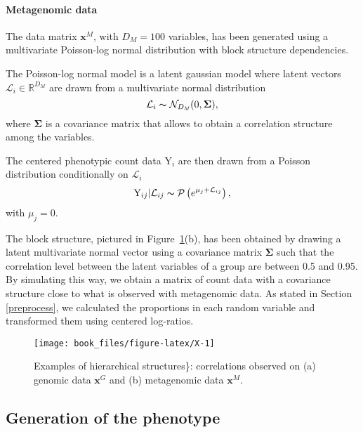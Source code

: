 \documentclass[]{book}
\let\oldparagraph\paragraph
\renewcommand{\paragraph}[1]{\oldparagraph{#1}\mbox{}}
\begin{document}
\hypertarget{metagenomic-data}{%
\paragraph{Metagenomic data}\label{metagenomic-data}}

The data matrix \(\mathbf{x}^{\mathit{M}}\), with \(D_\mathit{M}=100\) variables, has been
generated using a multivariate Poisson-log normal distribution
\citep{aitchison1989multivariate} with block structure dependencies.

The Poisson-log normal model is a latent gaussian model where latent
vectors \(\mathcal{L}_i \in \mathbb{R}^{D_\mathit{M}}\) are drawn from a multivariate
normal distribution
\[\mathcal{L}_i \thicksim \mathcal{N}_{D_\mathit{M}}(0, \boldsymbol{\Sigma}),\] where
\(\boldsymbol{\Sigma}\) is a covariance matrix that allows to obtain a correlation
structure among the variables.

The centered phenotypic count data \(\mathrm{Y}_i\) are then drawn from a Poisson
distribution conditionally on \(\mathcal{L}_i\)
\[\mathrm{Y}_{ij}|\mathcal{L}_{ij} \thicksim \mathcal{P}\left( e^{\mu_j + \mathcal{L}_{ij}}\right),\]
with \(\mu_j = 0\).

The block structure, pictured in Figure~\ref{fig:X}(b), has been obtained by
drawing a latent multivariate normal vector using a covariance matrix
\(\boldsymbol{\Sigma}\) such that the correlation level between the latent variables
of a group are between 0.5 and 0.95. By simulating this way, we obtain a
matrix of count data with a covariance structure close to what is
observed with metagenomic data. As stated in Section \ref{preprocess},
we calculated the proportions in each random variable and transformed
them using centered log-ratios.



\begin{figure}

{\centering \texttt{[image: book\_files/figure-latex/X-1]} 

}

\caption{Examples of hierarchical structures\}: correlations observed on (a) genomic data \(\mathbf{x}^\mathit{G}\) and (b) metagenomic data \(\mathbf{x}^\mathit{M}\).}\label{fig:X}
\end{figure}

\hypertarget{generation-of-the-phenotype}{%
\subsection{Generation of the phenotype}\label{generation-of-the-phenotype}}
\end{document}
